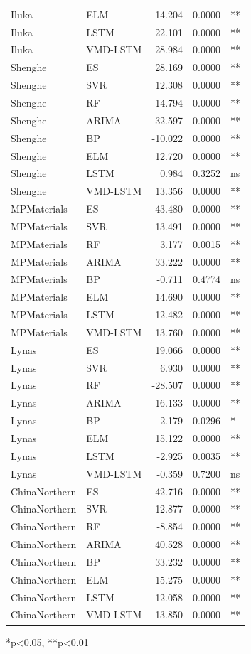 \begin{tabular}{llrrl}
Iluka & ELM & 14.204 & 0.0000 & ** \\ 
Iluka & LSTM & 22.101 & 0.0000 & ** \\ 
Iluka & VMD-LSTM & 28.984 & 0.0000 & ** \\ 
Shenghe & ES & 28.169 & 0.0000 & ** \\ 
Shenghe & SVR & 12.308 & 0.0000 & ** \\ 
Shenghe & RF & -14.794 & 0.0000 & ** \\ 
Shenghe & ARIMA & 32.597 & 0.0000 & ** \\ 
Shenghe & BP & -10.022 & 0.0000 & ** \\ 
Shenghe & ELM & 12.720 & 0.0000 & ** \\ 
Shenghe & LSTM & 0.984 & 0.3252 & ns \\ 
Shenghe & VMD-LSTM & 13.356 & 0.0000 & ** \\ 
MPMaterials & ES & 43.480 & 0.0000 & ** \\ 
MPMaterials & SVR & 13.491 & 0.0000 & ** \\ 
MPMaterials & RF & 3.177 & 0.0015 & ** \\ 
MPMaterials & ARIMA & 33.222 & 0.0000 & ** \\ 
MPMaterials & BP & -0.711 & 0.4774 & ns \\ 
MPMaterials & ELM & 14.690 & 0.0000 & ** \\ 
MPMaterials & LSTM & 12.482 & 0.0000 & ** \\ 
MPMaterials & VMD-LSTM & 13.760 & 0.0000 & ** \\ 
Lynas & ES & 19.066 & 0.0000 & ** \\ 
Lynas & SVR & 6.930 & 0.0000 & ** \\ 
Lynas & RF & -28.507 & 0.0000 & ** \\ 
Lynas & ARIMA & 16.133 & 0.0000 & ** \\ 
Lynas & BP & 2.179 & 0.0296 & * \\ 
Lynas & ELM & 15.122 & 0.0000 & ** \\ 
Lynas & LSTM & -2.925 & 0.0035 & ** \\ 
Lynas & VMD-LSTM & -0.359 & 0.7200 & ns \\ 
ChinaNorthern & ES & 42.716 & 0.0000 & ** \\ 
ChinaNorthern & SVR & 12.877 & 0.0000 & ** \\ 
ChinaNorthern & RF & -8.854 & 0.0000 & ** \\ 
ChinaNorthern & ARIMA & 40.528 & 0.0000 & ** \\ 
ChinaNorthern & BP & 33.232 & 0.0000 & ** \\ 
ChinaNorthern & ELM & 15.275 & 0.0000 & ** \\ 
ChinaNorthern & LSTM & 12.058 & 0.0000 & ** \\ 
ChinaNorthern & VMD-LSTM & 13.850 & 0.0000 & ** \\ 
\bottomrule \end{tabular}
\footnotesize{*p<0.05, **p<0.01}